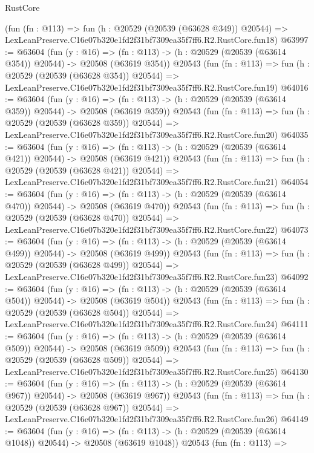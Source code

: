\begin{lexlean}{RustCore}
\begin{coremodule}
    (fun (fn : @113) =>
    fun (h : @20529 (@20539 (@63628 @349)) @20544) =>
    LexLeanPreserve.C16e07b320e1fd2f31bf7309ea35f7ff6.R2.RustCore.fun18)
@63997 := @63604
    (fun (y : @16) =>
    (fn : @113) -> (h : @20529 (@20539 (@63614 @354)) @20544) -> @20508 (@63619 @354))
    @20543
    (fun (fn : @113) =>
    fun (h : @20529 (@20539 (@63628 @354)) @20544) =>
    LexLeanPreserve.C16e07b320e1fd2f31bf7309ea35f7ff6.R2.RustCore.fun19)
@64016 := @63604
    (fun (y : @16) =>
    (fn : @113) -> (h : @20529 (@20539 (@63614 @359)) @20544) -> @20508 (@63619 @359))
    @20543
    (fun (fn : @113) =>
    fun (h : @20529 (@20539 (@63628 @359)) @20544) =>
    LexLeanPreserve.C16e07b320e1fd2f31bf7309ea35f7ff6.R2.RustCore.fun20)
@64035 := @63604
    (fun (y : @16) =>
    (fn : @113) -> (h : @20529 (@20539 (@63614 @421)) @20544) -> @20508 (@63619 @421))
    @20543
    (fun (fn : @113) =>
    fun (h : @20529 (@20539 (@63628 @421)) @20544) =>
    LexLeanPreserve.C16e07b320e1fd2f31bf7309ea35f7ff6.R2.RustCore.fun21)
@64054 := @63604
    (fun (y : @16) =>
    (fn : @113) -> (h : @20529 (@20539 (@63614 @470)) @20544) -> @20508 (@63619 @470))
    @20543
    (fun (fn : @113) =>
    fun (h : @20529 (@20539 (@63628 @470)) @20544) =>
    LexLeanPreserve.C16e07b320e1fd2f31bf7309ea35f7ff6.R2.RustCore.fun22)
@64073 := @63604
    (fun (y : @16) =>
    (fn : @113) -> (h : @20529 (@20539 (@63614 @499)) @20544) -> @20508 (@63619 @499))
    @20543
    (fun (fn : @113) =>
    fun (h : @20529 (@20539 (@63628 @499)) @20544) =>
    LexLeanPreserve.C16e07b320e1fd2f31bf7309ea35f7ff6.R2.RustCore.fun23)
@64092 := @63604
    (fun (y : @16) =>
    (fn : @113) -> (h : @20529 (@20539 (@63614 @504)) @20544) -> @20508 (@63619 @504))
    @20543
    (fun (fn : @113) =>
    fun (h : @20529 (@20539 (@63628 @504)) @20544) =>
    LexLeanPreserve.C16e07b320e1fd2f31bf7309ea35f7ff6.R2.RustCore.fun24)
@64111 := @63604
    (fun (y : @16) =>
    (fn : @113) -> (h : @20529 (@20539 (@63614 @509)) @20544) -> @20508 (@63619 @509))
    @20543
    (fun (fn : @113) =>
    fun (h : @20529 (@20539 (@63628 @509)) @20544) =>
    LexLeanPreserve.C16e07b320e1fd2f31bf7309ea35f7ff6.R2.RustCore.fun25)
@64130 := @63604
    (fun (y : @16) =>
    (fn : @113) -> (h : @20529 (@20539 (@63614 @967)) @20544) -> @20508 (@63619 @967))
    @20543
    (fun (fn : @113) =>
    fun (h : @20529 (@20539 (@63628 @967)) @20544) =>
    LexLeanPreserve.C16e07b320e1fd2f31bf7309ea35f7ff6.R2.RustCore.fun26)
@64149 := @63604
    (fun (y : @16) =>
    (fn : @113) -> (h : @20529 (@20539 (@63614 @1048)) @20544) -> @20508 (@63619 @1048))
    @20543
    (fun (fn : @113) =>

\end{coremodule}
\end{lexlean}
